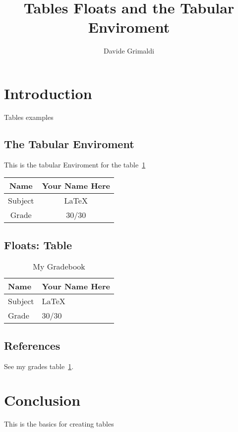 \documentclass{article}
\title{Tables Floats and the Tabular Enviroment}
\author{Davide Grimaldi}
\date{}
\begin{document}
    \maketitle
    \section{Introduction}
        Tables examples

        \subsection{The Tabular Enviroment}
            This is the tabular Enviroment for the table~\ref{tab:grades}
            \vspace*{.5cm} %
            \\
            \begin{tabular}{|c|c|} %
                \hline %
                Name & Your Name Here \\
                \hline
                Subject & \LaTeX \\
                \hline
                Grade & 30/30 \\
                \hline
            \end{tabular}
        
        \subsection{Floats: Table}
            \begin{table}[htbp] %
                \caption{My Gradebook}
                \begin{center}
                    \begin{tabular}{|l|l|} 
                        \hline
                        Name & Your Name Here \\
                        \hline
                        Subject & \LaTeX \\
                        \hline
                        Grade & 30/30 \\
                        \hline
                    \end{tabular}
                \end{center}
                \label{tab:grades} %
            \end{table}

            \subsection{References}
                See my grades table~\ref{tab:grades}.

    \section{Conclusion}
        This is the basics for creating tables
\end{document}
